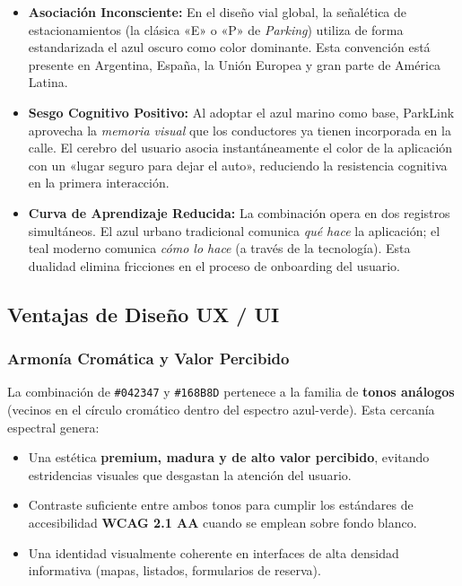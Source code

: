 \begin{itemize}
  \item \textbf{Asociación Inconsciente:} En el diseño vial global, la señalética de estacionamientos (la clásica «E» o «P» de \textit{Parking}) utiliza de forma estandarizada el azul oscuro como color dominante. Esta convención está presente en Argentina, España, la Unión Europea y gran parte de América Latina.

  \item \textbf{Sesgo Cognitivo Positivo:} Al adoptar el azul marino como base, ParkLink aprovecha la \textit{memoria visual} que los conductores ya tienen incorporada en la calle. El cerebro del usuario asocia instantáneamente el color de la aplicación con un «lugar seguro para dejar el auto», reduciendo la resistencia cognitiva en la primera interacción.

  \item \textbf{Curva de Aprendizaje Reducida:} La combinación opera en dos registros simultáneos. El azul urbano tradicional comunica \textit{qué hace} la aplicación; el teal moderno comunica \textit{cómo lo hace} (a través de la tecnología). Esta dualidad elimina fricciones en el proceso de onboarding del usuario.
\end{itemize}

\subsection{Ventajas de Diseño UX / UI}

\subsubsection{Armonía Cromática y Valor Percibido}

La combinación de \texttt{\#042347} y \texttt{\#168B8D} pertenece a la familia de \textbf{tonos análogos} (vecinos en el círculo cromático dentro del espectro azul-verde). Esta cercanía espectral genera:

\begin{itemize}
  \item Una estética \textbf{premium, madura y de alto valor percibido}, evitando estridencias visuales que desgastan la atención del usuario.
  \item Contraste suficiente entre ambos tonos para cumplir los estándares de accesibilidad \textbf{WCAG 2.1 AA} cuando se emplean sobre fondo blanco. \cite{mdn_wcag_contrast}
  \item Una identidad visualmente coherente en interfaces de alta densidad informativa (mapas, listados, formularios de reserva).
\end{itemize}

